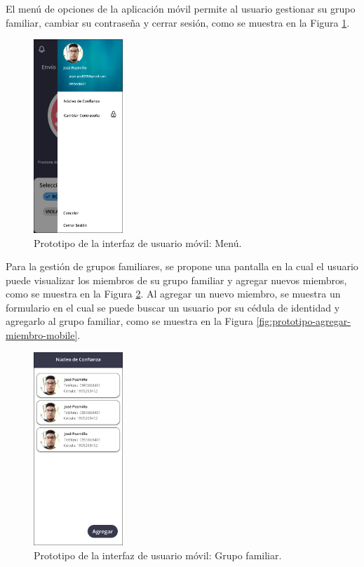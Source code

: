 El menú de opciones de la aplicación móvil permite al usuario gestionar su grupo familiar, cambiar su contraseña y cerrar sesión, como se muestra
en la Figura \ref{fig:prototipo-menu-mobile}.

\begin{figure}[H]
    \centering
    \includegraphics[width=0.3\textwidth]{chapters/III-resultados-y-discusion/resources/images/prototipo-menu-mobile.png}
    \caption{Prototipo de la interfaz de usuario móvil: Menú.}
    \label{fig:prototipo-menu-mobile}
\end{figure}

Para la gestión de grupos familiares, se propone una pantalla en la cual el usuario puede visualizar los miembros de su grupo familiar y agregar
nuevos miembros, como se muestra en la Figura \ref{fig:prototipo-grupo-familiar-mobile}. Al agregar un nuevo miembro, se muestra un formulario
en el cual se puede buscar un usuario por su cédula de identidad y agregarlo al grupo familiar, como se muestra en la Figura \ref{fig:prototipo-agregar-miembro-mobile}.

\begin{figure}[H]
    \centering
    \includegraphics[width=0.3\textwidth]{chapters/III-resultados-y-discusion/resources/images/prototipo-grupo-familiar-mobile.png}
    \caption{Prototipo de la interfaz de usuario móvil: Grupo familiar.}
    \label{fig:prototipo-grupo-familiar-mobile}
\end{figure}

